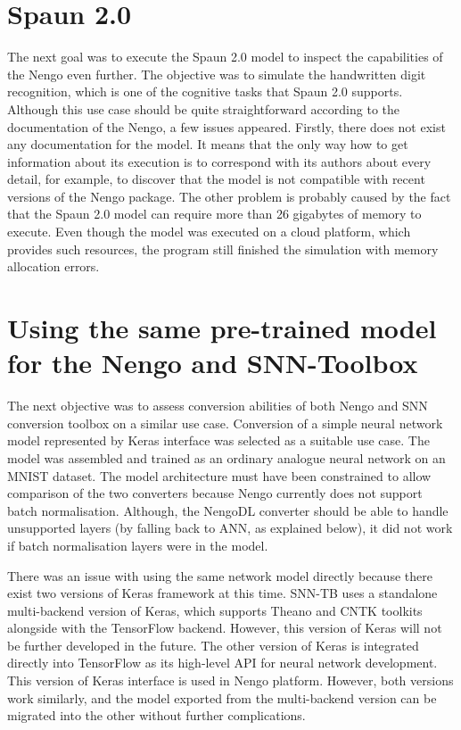 \section{Spaun 2.0}
The next goal was to execute the Spaun 2.0 model to inspect the capabilities of the Nengo even further. The objective was to simulate the handwritten digit recognition, which is one of the cognitive tasks that Spaun 2.0 supports. Although this use case should be quite straightforward according to the documentation of the Nengo, a few issues appeared. Firstly, there does not exist any documentation for the model. It means that the only way how to get information about its execution is to correspond with its authors about every detail, for example, to discover that the model is not compatible with recent versions of the Nengo package. The other problem is probably caused by the fact that the Spaun 2.0 model can require more than 26 gigabytes of memory to execute. Even though the model was executed on a cloud platform, which provides such resources, the program still finished the simulation with memory allocation errors.

\section{Using the same pre-trained model for the Nengo and SNN-Toolbox}
The next objective was to assess conversion abilities of both Nengo and SNN conversion toolbox on a similar use case. Conversion of a simple neural network model represented by Keras interface was selected as a suitable use case. The model was assembled and trained as an ordinary analogue neural network on an MNIST dataset. The model architecture must have been constrained to allow comparison of the two converters because Nengo currently does not support batch normalisation. Although, the NengoDL converter should be able to handle unsupported layers (by falling back to ANN, as explained below), it did not work if batch normalisation layers were in the model.\par
There was an issue with using the same network model directly because there exist two versions of Keras framework at this time. SNN-TB uses a standalone multi-backend version of Keras, which supports Theano and CNTK toolkits alongside with the TensorFlow backend. However, this version of Keras will not be further developed in the future. The other version of Keras is integrated directly into TensorFlow as its high-level API for neural network development. This version of Keras interface is used in Nengo platform. However, both versions work similarly, and the model exported from the multi-backend version can be migrated into the other without further complications.

